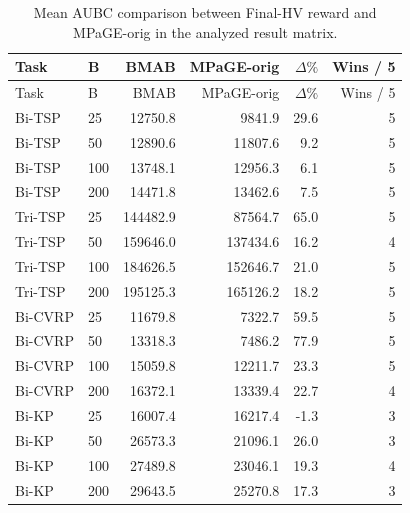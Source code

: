 \begin{longtable}{llrrrr}
\caption[Mean AUBC comparison]{Mean AUBC comparison between Final-HV reward and MPaGE-orig in the analyzed result matrix.}
\label{tab:aubc-results}\\
\toprule
Task & B & BMAB & MPaGE-orig & $\Delta\%$ & Wins / 5 \\
\midrule
\endfirsthead
\toprule
Task & B & BMAB & MPaGE-orig & $\Delta\%$ & Wins / 5 \\
\midrule
\endhead
Bi-TSP & 25 & 12750.8 & 9841.9 & 29.6 & 5 \\
Bi-TSP & 50 & 12890.6 & 11807.6 & 9.2 & 5 \\
Bi-TSP & 100 & 13748.1 & 12956.3 & 6.1 & 5 \\
Bi-TSP & 200 & 14471.8 & 13462.6 & 7.5 & 5 \\
Tri-TSP & 25 & 144482.9 & 87564.7 & 65.0 & 5 \\
Tri-TSP & 50 & 159646.0 & 137434.6 & 16.2 & 4 \\
Tri-TSP & 100 & 184626.5 & 152646.7 & 21.0 & 5 \\
Tri-TSP & 200 & 195125.3 & 165126.2 & 18.2 & 5 \\
Bi-CVRP & 25 & 11679.8 & 7322.7 & 59.5 & 5 \\
Bi-CVRP & 50 & 13318.3 & 7486.2 & 77.9 & 5 \\
Bi-CVRP & 100 & 15059.8 & 12211.7 & 23.3 & 5 \\
Bi-CVRP & 200 & 16372.1 & 13339.4 & 22.7 & 4 \\
Bi-KP & 25 & 16007.4 & 16217.4 & -1.3 & 3 \\
Bi-KP & 50 & 26573.3 & 21096.1 & 26.0 & 3 \\
Bi-KP & 100 & 27489.8 & 23046.1 & 19.3 & 4 \\
Bi-KP & 200 & 29643.5 & 25270.8 & 17.3 & 3 \\
\bottomrule
\end{longtable}
